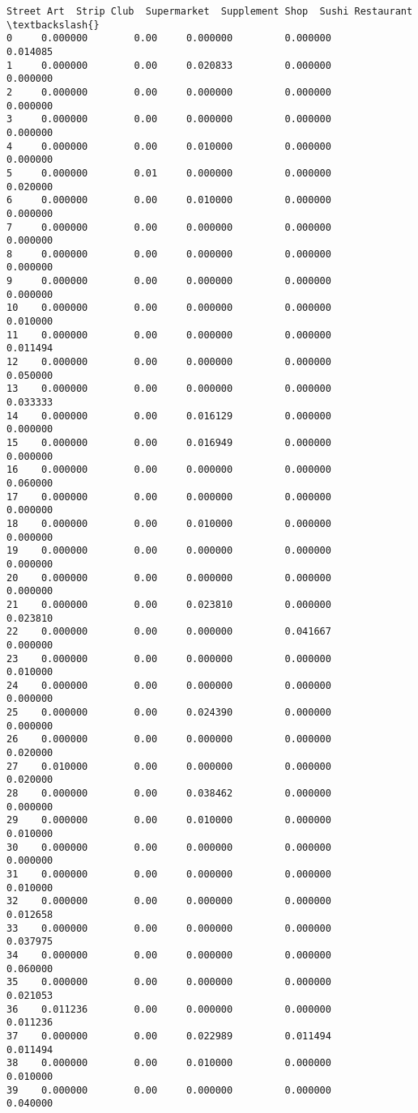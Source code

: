 \documentclass[11pt]{article}
\begin{document}
\begin{tcolorbox}[breakable, size=fbox, boxrule=.5pt, pad at break*=1mm, opacityfill=0]
\begin{Verbatim}[commandchars=\\\{\}]
    Street Art  Strip Club  Supermarket  Supplement Shop  Sushi Restaurant  \textbackslash{}
0     0.000000        0.00     0.000000         0.000000          0.014085
1     0.000000        0.00     0.020833         0.000000          0.000000
2     0.000000        0.00     0.000000         0.000000          0.000000
3     0.000000        0.00     0.000000         0.000000          0.000000
4     0.000000        0.00     0.010000         0.000000          0.000000
5     0.000000        0.01     0.000000         0.000000          0.020000
6     0.000000        0.00     0.010000         0.000000          0.000000
7     0.000000        0.00     0.000000         0.000000          0.000000
8     0.000000        0.00     0.000000         0.000000          0.000000
9     0.000000        0.00     0.000000         0.000000          0.000000
10    0.000000        0.00     0.000000         0.000000          0.010000
11    0.000000        0.00     0.000000         0.000000          0.011494
12    0.000000        0.00     0.000000         0.000000          0.050000
13    0.000000        0.00     0.000000         0.000000          0.033333
14    0.000000        0.00     0.016129         0.000000          0.000000
15    0.000000        0.00     0.016949         0.000000          0.000000
16    0.000000        0.00     0.000000         0.000000          0.060000
17    0.000000        0.00     0.000000         0.000000          0.000000
18    0.000000        0.00     0.010000         0.000000          0.000000
19    0.000000        0.00     0.000000         0.000000          0.000000
20    0.000000        0.00     0.000000         0.000000          0.000000
21    0.000000        0.00     0.023810         0.000000          0.023810
22    0.000000        0.00     0.000000         0.041667          0.000000
23    0.000000        0.00     0.000000         0.000000          0.010000
24    0.000000        0.00     0.000000         0.000000          0.000000
25    0.000000        0.00     0.024390         0.000000          0.000000
26    0.000000        0.00     0.000000         0.000000          0.020000
27    0.010000        0.00     0.000000         0.000000          0.020000
28    0.000000        0.00     0.038462         0.000000          0.000000
29    0.000000        0.00     0.010000         0.000000          0.010000
30    0.000000        0.00     0.000000         0.000000          0.000000
31    0.000000        0.00     0.000000         0.000000          0.010000
32    0.000000        0.00     0.000000         0.000000          0.012658
33    0.000000        0.00     0.000000         0.000000          0.037975
34    0.000000        0.00     0.000000         0.000000          0.060000
35    0.000000        0.00     0.000000         0.000000          0.021053
36    0.011236        0.00     0.000000         0.000000          0.011236
37    0.000000        0.00     0.022989         0.011494          0.011494
38    0.000000        0.00     0.010000         0.000000          0.010000
39    0.000000        0.00     0.000000         0.000000          0.040000


\end{Verbatim}
\end{tcolorbox}
\end{document}
